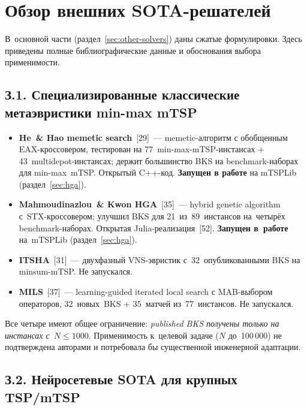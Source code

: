 \documentclass[a4paper,14pt]{extreport}
\begin{document}
\chapter{Обзор внешних SOTA-решателей}
\label{ch:appendix-sota}

В~основной части (раздел~\ref{sec:other-solvers}) даны сжатые формулировки. Здесь приведены полные библиографические данные и обоснования выбора применимости.

\section*{З.1. Специализированные классические метаэвристики min-max mTSP}

\begin{itemize}
\item \textbf{He~\& Hao memetic search}~[29]~--- memetic-алгоритм с обобщенным EAX-кроссовером, тестирован на 77~min-max-mTSP-инстансах + 43~multidepot-инстансах; держит большинство BKS на benchmark-наборах для min-max~mTSP. Открытый C++-код. \textbf{Запущен в работе} на mTSPLib (раздел~\ref{sec:hga}).
\item \textbf{Mahmoudinazlou~\& Kwon HGA}~[35]~--- hybrid genetic algorithm с~STX-кроссовером; улучшил BKS для 21~из~89~инстансов на~четырёх benchmark-наборах. Открытая Julia-реализация~[52]. \textbf{Запущен в~работе} на~mTSPLib (раздел~\ref{sec:hga}).
\item \textbf{ITSHA}~[31]~--- двухфазный VNS-эвристик с~32~опубликованными BKS на minsum-mTSP. Не запускался.
\item \textbf{MILS}~[37]~--- learning-guided iterated local search с MAB-выбором операторов, 32~новых~BKS + 35~матчей из~77~инстансов. Не запускался.
\end{itemize}

Все четыре имеют общее ограничение: \emph{published BKS получены только на инстансах с~$N \leq 1000$}. Применимость к~целевой задаче ($N$ до~100\,000) не подтверждена авторами и потребовала бы существенной инженерной адаптации.

\section*{З.2. Нейросетевые SOTA для крупных TSP/mTSP}
\end{document}
